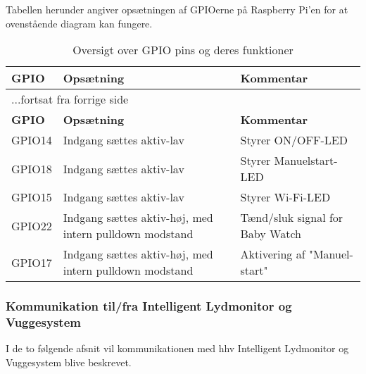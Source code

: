 
Tabellen herunder angiver opsætningen af GPIOerne på Raspberry Pi'en for at ovenstående diagram kan fungere.

\begin{center}
\label{ctrl:raspberry_pi_setup}
\begin{longtable}{|p{3cm}|p{4cm}|p{4cm}|}
\caption{Oversigt over GPIO pins og deres funktioner}\\
\hline
\textbf{GPIO}	&\textbf{Opsætning} 		&\textbf{Kommentar} 	\\ \hline
\endfirsthead
\multicolumn{3}{l}{...fortsat fra forrige side} \\ \hline 
\textbf{GPIO}	&\textbf{Opsætning} 		&\textbf{Kommentar}  \\ \hline
\endhead



GPIO14
&Indgang sættes aktiv-lav
&Styrer ON/OFF-LED

\\\hline

GPIO18
&Indgang sættes aktiv-lav
&Styrer Manuelstart-LED

\\\hline


GPIO15
&Indgang sættes aktiv-lav
&Styrer Wi-Fi-LED

\\\hline

GPIO22
&Indgang sættes aktiv-høj, med intern pulldown modstand
&Tænd/sluk signal for Baby Watch

\\\hline

GPIO17
&Indgang sættes aktiv-høj, med intern pulldown modstand
&Aktivering af "Manuel-start"
\\\hline

\end{longtable}
\end{center}

\subsubsection*{Kommunikation til/fra Intelligent Lydmonitor og Vuggesystem}

I de to følgende afsnit vil kommunikationen med hhv Intelligent Lydmonitor og Vuggesystem blive beskrevet.

